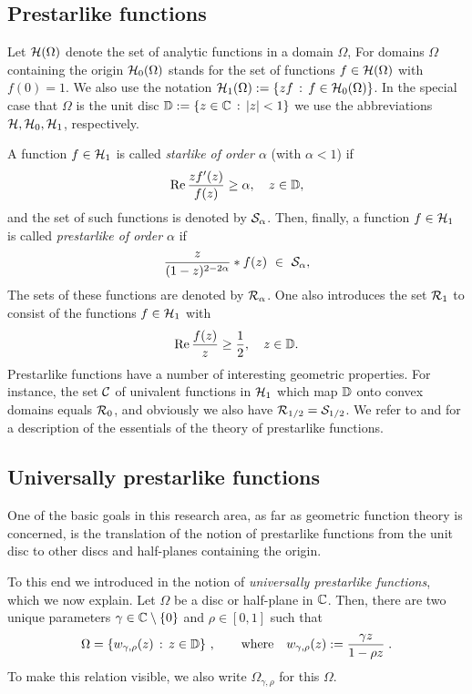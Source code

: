 \subsection{Prestarlike functions}
Let ${\mathcal H }(\Omega)$ denote the set of analytic functions in a domain
$\Omega$, For domains $\Omega$ containing the origin ${\mathcal H }_0(\Omega)$
stands for the set of functions $f\in{\mathcal H }(\Omega)$ with 
$f(0)=1$. We also use the notation
${\mathcal H }_1(\Omega):=\{zf\,:\,f\in{\mathcal H }_0(\Omega)\}$. In the special case that
$\Omega$ is the unit disc ${\mathbb D }:=\{z\in{\mathbb C }\,:\,|z|<1\}$ we use
the abbreviations ${\mathcal H },{\mathcal H }_0,{\mathcal H }_1$, respectively.

A function $f\in{\mathcal H }_1$ is called {\em starlike of order  $\alpha$}
(with $\alpha<1$) if
$$
\mbox{\rm Re}\,\frac{zf'(z)}{f(z)}\geq\alpha,\quad z\in{\mathbb D },
$$
and the set of such functions is denoted by ${\mathcal S }_\alpha$. Then,
finally, a function $f\in{\mathcal H }_1$ is called {\em prestarlike of order $\alpha$ }
if
\begin{equation}\lab{eq:1.1}
\frac{z}{(1-z)^{2-2\alpha}}*f(z)\ \in\ \CS_\alpha,
\end{equation}
The sets of these functions are denoted by ${\mathcal R}_\alpha$.
One also introduces the set ${\mathcal R}_1$ to consist of the functions $f\in{\mathcal H }_1$
with
$$
\mbox{\rm Re}\,\frac{f(z)}{z}\geq\frac{1}{2},\quad z\in{\mathbb D }.
$$
Prestarlike functions have a number of interesting geometric
properties. For instance, the set ${\mathcal C }$ of univalent functions in ${\mathcal H }_1$
which map ${\mathbb D }$ onto convex domains equals ${\mathcal R}_0$, and 
obviously we  also have ${\mathcal R}_{1/2}={\mathcal S }_{1/2}$. We refer to 
\cite{ru-montreal} 
and %
\cite{ssm-book} for a description of
the essentials of the theory of prestarlike functions. 

\subsection{Universally prestarlike functions}
One of the basic goals in this research area, as far as geometric function
theory is concerned, is the translation of the notion of prestarlike functions
from the unit disc to other discs and half-planes containing the
origin.

To this end we introduced in \cite{RSS} the notion of
{\em universally prestarlike functions\/}, which we now explain.
Let $\Omega$ be a disc or half-plane in ${\mathbb C }$. 
Then, there are two unique parameters $\gamma\in{\mathbb C }\setminus\{0\}$ and 
$\rho\in[0,1]$ such that
$$
\Omega=
\left\{w_{\gamma,\rho}(z)\,:\, z\in{\mathbb D }\right\}\,,\qquad\text{where}\quad
w_{\gamma,\rho}(z):= \frac{\gamma z}{1-\rho z}\;.
$$
To make this relation visible, we also write $\Omega_{\gamma,\rho}$ for
this $\Omega$.

